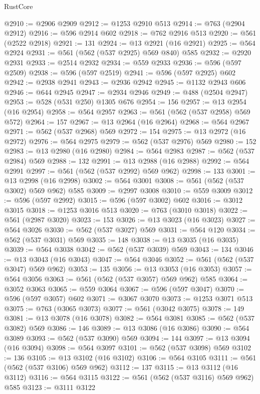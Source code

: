 \begin{lexlean}{RustCore}
\begin{coremodule}
@2910 := @2906 @2909
@2912 := @1253 @2910 @513
@2914 := @763 (@2904 @2912)
@2916 := @596 @2914 @602
@2918 := @762 @2916 @513
@2920 := @561 (@2522 @2918)
@2921 := 131
@2924 := @13 @2921 (@16 @2921)
@2925 := @564 @2924
@2931 := @561 (@562 (@537 @2925) @569 @840) @585
@2932 := @2920 @2931
@2933 := @2514 @2932
@2934 := @559 @2933
@2936 := @596 (@597 @2509)
@2938 := @596 (@597 @2519)
@2941 := @596 (@597 @2925) @602
@2942 := @2938 @2941
@2943 := @2936 @2942
@2945 := @1132 @2943 @606
@2946 := @644 @2945
@2947 := @2934 @2946
@2949 := @488 (@2504 @2947)
@2953 := @528 (@531 @250) @1305 @676
@2954 := 156
@2957 := @13 @2954 (@16 @2954)
@2958 := @564 @2957
@2963 := @561 (@562 (@537 @2958) @569 @572)
@2964 := 157
@2967 := @13 @2964 (@16 @2964)
@2968 := @564 @2967
@2971 := @562 (@537 @2968) @569
@2972 := 154
@2975 := @13 @2972 (@16 @2972)
@2976 := @564 @2975
@2979 := @562 (@537 @2976) @569
@2980 := 152
@2983 := @13 @2980 (@16 @2980)
@2984 := @564 @2983
@2987 := @562 (@537 @2984) @569
@2988 := 132
@2991 := @13 @2988 (@16 @2988)
@2992 := @564 @2991
@2997 := @561 (@562 (@537 @2992) @569 @962)
@2998 := 133
@3001 := @13 @2998 (@16 @2998)
@3002 := @564 @3001
@3008 := @561 (@562 (@537 @3002) @569 @962) @585
@3009 := @2997 @3008
@3010 := @559 @3009
@3012 := @596 (@597 @2992)
@3015 := @596 (@597 @3002) @602
@3016 := @3012 @3015
@3018 := @1253 @3016 @513
@3020 := @763 (@3010 @3018)
@3022 := @561 (@2987 @3020)
@3023 := 153
@3026 := @13 @3023 (@16 @3023)
@3027 := @564 @3026
@3030 := @562 (@537 @3027) @569
@3031 := @564 @120
@3034 := @562 (@537 @3031) @569
@3035 := 148
@3038 := @13 @3035 (@16 @3035)
@3039 := @564 @3038
@3042 := @562 (@537 @3039) @569
@3043 := 134
@3046 := @13 @3043 (@16 @3043)
@3047 := @564 @3046
@3052 := @561 (@562 (@537 @3047) @569 @962)
@3053 := 135
@3056 := @13 @3053 (@16 @3053)
@3057 := @564 @3056
@3063 := @561 (@562 (@537 @3057) @569 @962) @585
@3064 := @3052 @3063
@3065 := @559 @3064
@3067 := @596 (@597 @3047)
@3070 := @596 (@597 @3057) @602
@3071 := @3067 @3070
@3073 := @1253 @3071 @513
@3075 := @763 (@3065 @3073)
@3077 := @561 (@3042 @3075)
@3078 := 149
@3081 := @13 @3078 (@16 @3078)
@3082 := @564 @3081
@3085 := @562 (@537 @3082) @569
@3086 := 146
@3089 := @13 @3086 (@16 @3086)
@3090 := @564 @3089
@3093 := @562 (@537 @3090) @569
@3094 := 144
@3097 := @13 @3094 (@16 @3094)
@3098 := @564 @3097
@3101 := @562 (@537 @3098) @569
@3102 := 136
@3105 := @13 @3102 (@16 @3102)
@3106 := @564 @3105
@3111 := @561 (@562 (@537 @3106) @569 @962)
@3112 := 137
@3115 := @13 @3112 (@16 @3112)
@3116 := @564 @3115
@3122 := @561 (@562 (@537 @3116) @569 @962) @585
@3123 := @3111 @3122

\end{coremodule}
\end{lexlean}

